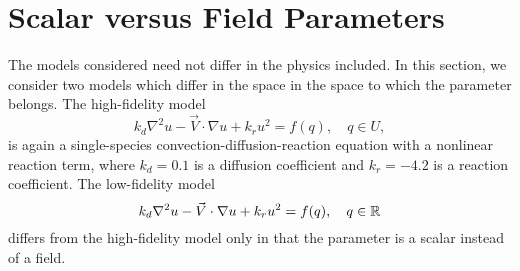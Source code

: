 	




\section{Scalar versus Field Parameters}  %

The models considered need not differ in the physics included. In this section, we consider two models which differ in the space in the space to which the parameter belongs. The high-fidelity model 
\begin{equation}
k_d\nabla^2 u - \vec{V}\cdot\nabla u + k_ru^2= f(q),\quad q\in U,
\end{equation}
is again a single-species convection-diffusion-reaction equation with a nonlinear reaction term, where $k_d = 0.1$ is a diffusion coefficient and $k_r = -4.2$ is a reaction coefficient. The low-fidelity model
\begin{equation}
k_d\nabla^2 u - \vec{V}\cdot\nabla u + k_ru^2= f(q),\quad q\in{\mathbb{R}}
\end{equation}
differs from the high-fidelity model only in that the parameter is a scalar instead of a field.

